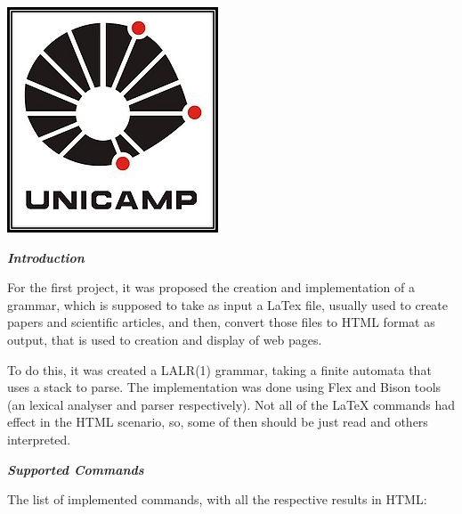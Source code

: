 \documentclass{article}
\begin{document}
\includegraphics{unicamp}

\textbf{\textit{Introduction}}

For the first project, it was proposed the creation and implementation of a grammar, which is supposed to take as input a LaTex file, usually used to create papers and scientific articles, and then, convert those files to HTML format as output, that is used to creation and display of web pages.

To do this, it was created a LALR(1) grammar, taking a finite automata that uses a stack to parse. The implementation was done using Flex and Bison tools (an lexical analyser and parser respectively). Not all of the LaTeX commands had effect in the HTML scenario, so, some of then should be just read and others interpreted.

\textit{\textbf{Supported Commands}}

The list of implemented commands, with all the respective results in HTML:
\end{document}
